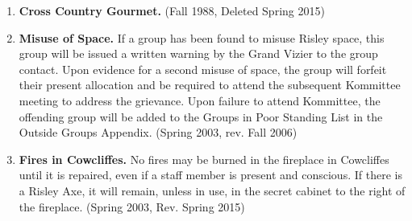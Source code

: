 \documentclass[12pt]{article}
\begin{document}
\begin{enumerate}[1.]
\item \textbf{Cross Country Gourmet.} (Fall 1988, Deleted Spring 2015)
\item \textbf{Misuse of Space.} If a group has been found to misuse Risley space, this group will be issued a written warning by the Grand Vizier to the group contact. Upon evidence for a second misuse of space, the group will forfeit their present allocation and be required to attend the subsequent Kommittee meeting to address the grievance. Upon failure to attend Kommittee, the offending group will be added to the Groups in Poor Standing List in the Outside Groups Appendix. (Spring 2003, rev. Fall 2006)
\item \textbf{Fires in Cowcliffes.} No fires may be burned in the fireplace in Cowcliffes until it is repaired, even if a staff member is present and conscious. If there is a Risley Axe, it will remain, unless in use, in the secret cabinet to the right of the fireplace. (Spring 2003, Rev. Spring 2015) 
\end{enumerate}
\end{document}
